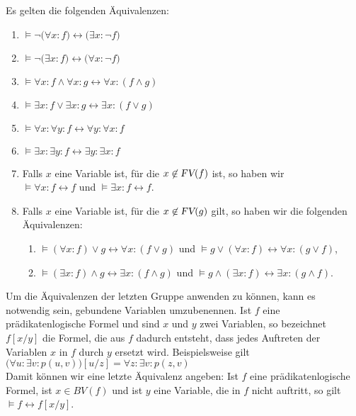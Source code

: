 \begin{Satz}
  Es gelten die folgenden Äquivalenzen:
  \begin{enumerate}
  \item $\models \neg\big(\forall x\colon f\big) \leftrightarrow \big(\exists x\colon \neg f\big)$
  \item $\models \neg\big(\exists x\colon f\big) \leftrightarrow \big(\forall x\colon \neg f\big)$
  \item $\models \forall x\colon f \wedge \forall x\colon g \leftrightarrow \forall x\colon (f \wedge g)$
  \item $\models \exists x\colon f \vee \exists x\colon g \leftrightarrow \exists x\colon (f \vee g)$
  \item $\models \forall x\colon \forall y\colon f \leftrightarrow \forall y\colon  \forall x\colon f$
  \item $\models \exists x\colon \exists y\colon f \leftrightarrow \exists y\colon  \exists x\colon f$
  \item Falls $x$ eine Variable ist, für die $x \not\in \textsl{FV}(f)$ ist, so haben wir \\[0.2cm]
        \hspace*{1.3cm} $\models  \forall x\colon f \leftrightarrow f$ \quad und \quad
                        $\models  \exists x\colon f \leftrightarrow f$.
  \item Falls $x$ eine Variable ist, für die  $x \not\in \textsl{FV}(g)$ gilt, so haben wir die folgenden Äquivalenzen:
    \begin{enumerate}
    \item $\models (\forall x\colon f) \vee g \leftrightarrow \forall x\colon (f \vee g)$ \quad und \quad $\models g \vee (\forall x\colon f) \leftrightarrow \forall x\colon (g \vee f)$,
    \item $\models (\exists x\colon f) \wedge g \leftrightarrow \exists x\colon (f \wedge g)$ \quad und \quad $\models g \wedge (\exists x\colon f) \leftrightarrow \exists x\colon (g \wedge f)$.
    \end{enumerate}
  \end{enumerate}
\end{Satz}

Um die Äquivalenzen der letzten Gruppe anwenden zu können, kann es notwendig sein,
gebundene Variablen umzubenennen. Ist $f$ eine prädikatenlogische Formel und sind $x$ und
$y$ zwei Variablen, so bezeichnet $f[x/y]$ die Formel, die aus $f$ dadurch entsteht, dass
jedes Auftreten der Variablen $x$ in $f$ durch $y$ ersetzt wird.  Beispielsweise gilt \\[0.2cm]
\hspace*{1.3cm} $\bigl(\forall u : \exists v : p(u,v)\bigr)[u/z] = \forall z : \exists v : p(z,v)$
\\[0.2cm]
Damit können wir eine letzte Äquivalenz angeben: Ist $f$ eine prädikatenlogische Formel,
ist $x \in BV(f)$ und ist $y$ eine Variable, die in $f$ nicht auftritt, so gilt \\[0.2cm]
\hspace*{1.3cm} $\models f \leftrightarrow f[x/y]$.
\vspace{0.3cm}

